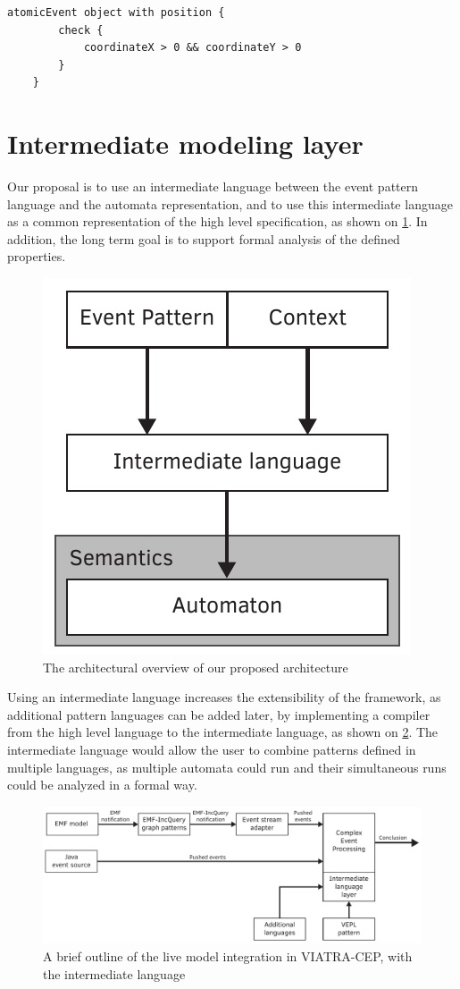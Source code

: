 \begin{lstlisting}[caption={Example of the Check expression in VIATRA-CEP},label={fig:viatracep:check}]
	atomicEvent object with position {
		check {
			coordinateX > 0 && coordinateY > 0
		}
	}
\end{lstlisting}



\section{Intermediate modeling layer}
Our proposal is to use an intermediate language between the event pattern language and the automata representation, and to use this intermediate language as a common representation of the high level specification, as shown on \cref{fig:viatracep:newcep}. In addition, the long term goal is to support formal analysis of the defined properties. 


\begin{figure}[h]
	\centering
	\includegraphics[width=0.4\linewidth]{figures/chapter_3/newcep}
	\caption{The architectural overview of our proposed architecture \redraw}
	\label{fig:viatracep:newcep}
\end{figure}


Using an intermediate language increases the extensibility of the framework, as additional pattern languages can be added later, by implementing a compiler from the high level language to the intermediate language, as shown on \cref{fig:viatracep:newinputs}.
The intermediate language would allow the user to combine patterns defined in multiple languages, as multiple automata could run and their simultaneous runs could be analyzed in a formal way.


\begin{figure}[h]
	\centering
	\includegraphics[width=0.9\linewidth]{figures/chapter_3/newinput}
	\caption{A brief outline of the live model integration in VIATRA-CEP, with the intermediate language \redraw}
	\label{fig:viatracep:newinputs}
\end{figure}